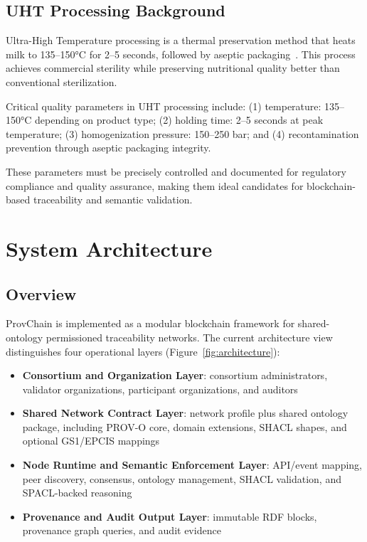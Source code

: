 \documentclass[preprint,review,12pt,authoryear]{elsarticle}
\begin{document}
\subsection{UHT Processing Background}

Ultra-High Temperature processing is a thermal preservation method that heats milk to 135--150°C for 2--5 seconds, followed by aseptic packaging~\cite{robinson2002dairy}. This process achieves commercial sterility while preserving nutritional quality better than conventional sterilization.

Critical quality parameters in UHT processing include: (1) temperature: 135--150°C depending on product type; (2) holding time: 2--5 seconds at peak temperature; (3) homogenization pressure: 150--250 bar; and (4) recontamination prevention through aseptic packaging integrity.

These parameters must be precisely controlled and documented for regulatory compliance and quality assurance, making them ideal candidates for blockchain-based traceability and semantic validation.

\section{System Architecture}\label{sec:architecture}

\subsection{Overview}

ProvChain is implemented as a modular blockchain framework for shared-ontology permissioned traceability networks. The current architecture view distinguishes four operational layers (Figure~\ref{fig:architecture}):

\begin{itemize}
    \item \textbf{Consortium and Organization Layer}: consortium administrators, validator organizations, participant organizations, and auditors
    \item \textbf{Shared Network Contract Layer}: network profile plus shared ontology package, including PROV-O core, domain extensions, SHACL shapes, and optional GS1/EPCIS mappings
    \item \textbf{Node Runtime and Semantic Enforcement Layer}: API/event mapping, peer discovery, consensus, ontology management, SHACL validation, and SPACL-backed reasoning
    \item \textbf{Provenance and Audit Output Layer}: immutable RDF blocks, provenance graph queries, and audit evidence
\end{itemize}
\end{document}

